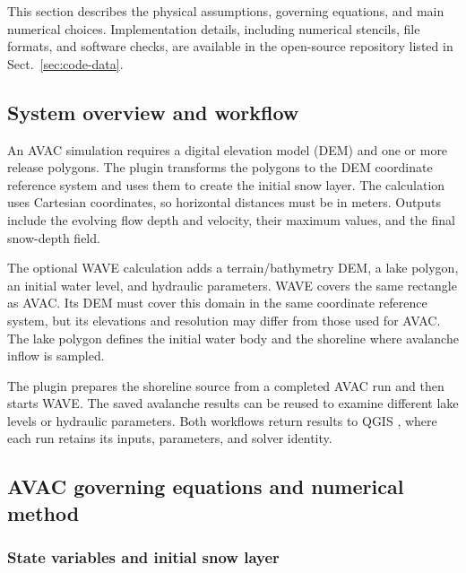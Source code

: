 \documentclass[11pt,a4paper]{article}
\newif\ifdraftnotes
\newcommand{\figureplan}[2]{%
  \ifdraftnotes
    \begin{figure}[htbp]
      \centering
      \fcolorbox{papergrid}{white}{%
        \parbox[c][42mm][c]{.88\textwidth}{%
          \centering
          \textcolor{paperink}{\textbf{Planned figure: #1}}\\[5pt]
          \small #2
        }
      }
      \caption{Working placeholder for #1.}
    \end{figure}
  \fi
}
\begin{document}
This section describes the physical assumptions, governing equations, and
main numerical choices. Implementation details, including numerical stencils,
file formats, and software checks, are available in the open-source repository
listed in Sect.~\ref{sec:code-data}.

\subsection{System overview and workflow}
\label{sec:system-overview}

An AVAC simulation requires a digital elevation model (DEM) and one or more
release polygons. The plugin transforms the polygons to the DEM coordinate
reference system and uses them to create the initial snow layer. The
calculation uses Cartesian coordinates, so horizontal distances must be in
meters. Outputs include the evolving flow depth and velocity, their maximum
values, and the final snow-depth field.

The optional WAVE calculation adds a terrain/bathymetry DEM, a lake polygon,
an initial water level, and hydraulic parameters. WAVE covers the same
rectangle as AVAC. Its DEM must cover this domain in the same coordinate
reference system, but its elevations and resolution may differ from those
used for AVAC. The lake polygon defines the initial water body and the
shoreline where avalanche inflow is sampled.

The plugin prepares the shoreline source from a completed AVAC run and then
starts WAVE. The saved avalanche results can be reused to examine different
lake levels or hydraulic parameters. Both workflows return results to QGIS
\citep{QGIS2026}, where each run retains its inputs, parameters, and solver
identity.

\figureplan{AVAC4QGIS architecture and data flow}{Show the standalone AVAC
workflow, the optional WAVE calculation, their DEM and polygon inputs, the
shoreline transfer, and the shared QGIS results workspace.}

\subsection{AVAC governing equations and numerical method}
\label{sec:avac-method}

\subsubsection{State variables and initial snow layer}
\end{document}
